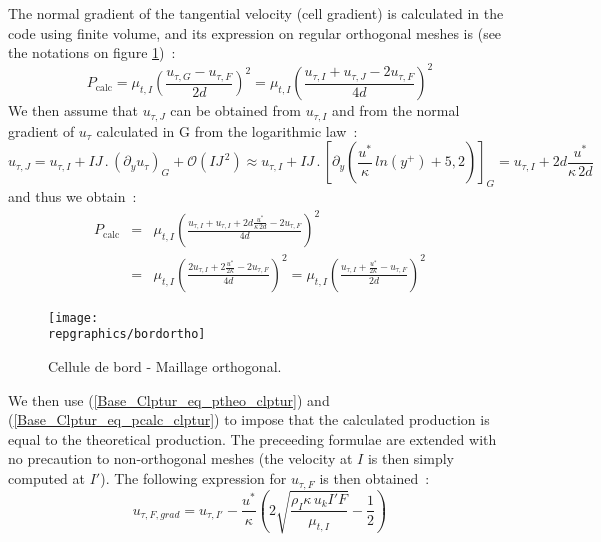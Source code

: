 The normal gradient of the tangential velocity (cell gradient)
is calculated in the code using finite volume, and its expression
on regular orthogonal meshes is (see the notations on 
figure \ref{Base_Clptur_fig_bord_ortho_clptur})~:
\begin{equation}
P_{\text{calc}} =
\mu_{t,I}\left(\displaystyle\frac{u_{\tau,G}-u_{\tau,F}}{2d}\right)^2 =
\mu_{t,I}\left(\displaystyle\frac{u_{\tau,I}+u_{\tau,J}-2u_{\tau,F}}{4d}\right)^2
\end{equation}
We then assume that $u_{\tau,J}$ can be obtained from $u_{\tau,I}$
and from the normal gradient of $u_{\tau}$ calculated in G
from the logarithmic law~:
\begin{equation}
\label{Base_Clptur_eq_dvp_lim_utau}
u_{\tau,J}=u_{\tau,I}+ IJ\,.\,(\partial_y u_{\tau})_G+\mathcal{O} (IJ^{\,2}) \approx
u_{\tau,I}+ IJ\,.\,\left[\partial_y \left(\displaystyle
\frac{u^*}{\kappa}\,ln{ (y^+)} + 5,2 \right)\right]_G=
u_{\tau,I}+2d\displaystyle\frac{u^*}{\kappa\, 2d}
\end{equation}
and thus we obtain~:
\begin{equation}\label{Base_Clptur_eq_pcalc_clptur}
\begin{array}{lll}
P_{\text{calc}} &=&
\mu_{t,I}\left(\displaystyle\frac{u_{\tau,I}+u_{\tau,I}+2d\frac{u^*}{\kappa\, 2d}-2u_{\tau,F}}{4d}\right)^2 \\
&=&\mu_{t,I}\left(\displaystyle\frac{2u_{\tau,I}+2\frac{u^*}{2\kappa}-2u_{\tau,F}}{4d}\right)^2 =
\mu_{t,I}\left(\displaystyle\frac{u_{\tau,I}+\frac{u^*}{2\kappa}-u_{\tau,F}}{2d}\right)^2
\end{array}
\end{equation}

\begin{figure}[h]
\centerline{\texttt{[image: \\repgraphics/bordortho]}}
\caption{\label{Base_Clptur_fig_bord_ortho_clptur}Cellule de bord - Maillage orthogonal.}
\end{figure}

We then use (\ref{Base_Clptur_eq_ptheo_clptur}) and 
(\ref{Base_Clptur_eq_pcalc_clptur}) to impose that the calculated 
production is equal to the theoretical production. The preceeding
formulae are extended with no precaution to non-orthogonal meshes (the velocity
at $I$ is then simply computed at $I'$). 
The following expression for $u_{\tau,F}$ is then obtained~:
\begin{equation}
u_{\tau,F,grad} =u_{\tau,I'}-\displaystyle\frac{u^*}{\kappa}\left(
2\sqrt{\displaystyle\frac{\rho_I\kappa\, u_k I'F}{\mu_{t,I}} }-\displaystyle\frac{1}{2}\right)
\end{equation}

